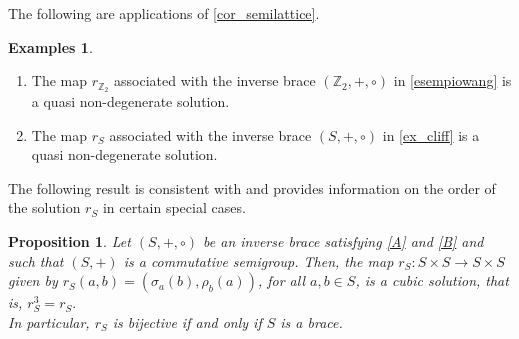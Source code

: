 \documentclass[preprint,1p]{elsarticle}
\newtheorem{prop}[theor]{Proposition}
\theoremstyle{definition}               %
\newtheorem{exs}[theor]{Examples}
\begin{document}
\smallskip
The following are applications of \cref{cor_semilattice}.
 \begin{exs}\hspace{1mm}
 \begin{enumerate}
 \item The map $r_{\mathbb{Z}_2}$ associated with the inverse brace $(\mathbb{Z}_2, +, \circ)$ in \cref{esempiowang} is a quasi non-degenerate solution. 
     \item The map $r_S$ associated with the inverse brace $(S, +, \circ)$ in  \cref{ex_cliff} is a quasi non-degenerate solution. 
 \end{enumerate}
 \end{exs}




\smallskip

The following result is consistent with \cite[Proposition 14]{CaMaMiSt22} and provides information on the order of the solution $r_S$ in certain special cases.
\begin{prop} \label{commutativo} 
    Let $(S,+,\circ)$ be an inverse brace  satisfying \eqref{A} and \eqref{B} and such that $(S,+)$ is
    a commutative semigroup. Then, the map $r_S:S \times S\to S\times S$ given by $r_S(a,b)=\left(\sigma_a(b), \rho_b(a)\right)$,
 for all $a, b \in S$, is a cubic solution, that is, $r_S^3=r_S.$\\
     In particular, $r_S$ is bijective if and only if $S$ is a brace. 
\end{prop}
\end{document}
